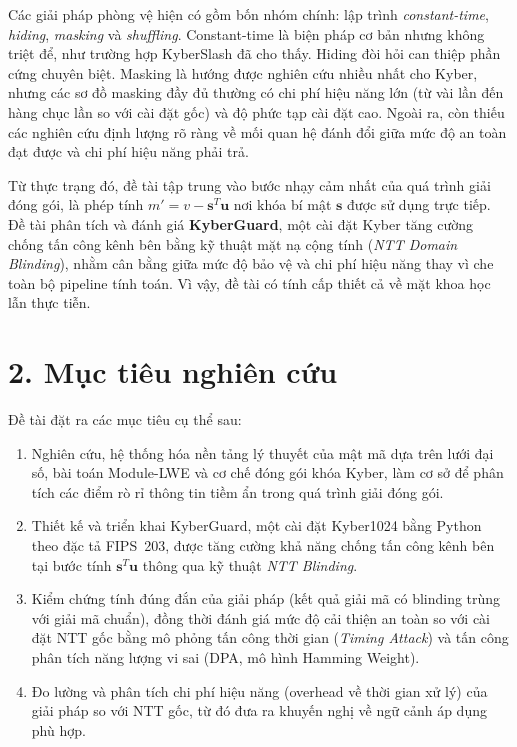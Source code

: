 \documentclass[../LuanVan.tex]{subfiles}
\begin{document}
Các giải pháp phòng vệ hiện có gồm bốn nhóm chính: lập trình \textit{constant-time}, \textit{hiding}, \textit{masking} và \textit{shuffling}. Constant-time là biện pháp cơ bản nhưng không triệt để, như trường hợp KyberSlash đã cho thấy. Hiding đòi hỏi can thiệp phần cứng chuyên biệt. Masking là hướng được nghiên cứu nhiều nhất cho Kyber, nhưng các sơ đồ masking đầy đủ thường có chi phí hiệu năng lớn (từ vài lần đến hàng chục lần so với cài đặt gốc) và độ phức tạp cài đặt cao. Ngoài ra, còn thiếu các nghiên cứu định lượng rõ ràng về mối quan hệ đánh đổi giữa mức độ an toàn đạt được và chi phí hiệu năng phải trả.

Từ thực trạng đó, đề tài tập trung vào bước nhạy cảm nhất của quá trình giải đóng gói, là phép tính $m' = v - \mathbf{s}^{T}\mathbf{u}$ nơi khóa bí mật $\mathbf{s}$ được sử dụng trực tiếp. Đề tài phân tích và đánh giá \textbf{KyberGuard}, một cài đặt Kyber tăng cường chống tấn công kênh bên bằng kỹ thuật mặt nạ cộng tính (\textit{NTT Domain Blinding}), nhằm cân bằng giữa mức độ bảo vệ và chi phí hiệu năng thay vì che toàn bộ pipeline tính toán. Vì vậy, đề tài có tính cấp thiết cả về mặt khoa học lẫn thực tiễn.

\section*{2. Mục tiêu nghiên cứu}

Đề tài đặt ra các mục tiêu cụ thể sau:
\begin{enumerate}
    \item Nghiên cứu, hệ thống hóa nền tảng lý thuyết của mật mã dựa trên lưới đại số, bài toán Module-LWE và cơ chế đóng gói khóa Kyber, làm cơ sở để phân tích các điểm rò rỉ thông tin tiềm ẩn trong quá trình giải đóng gói.
    \item Thiết kế và triển khai KyberGuard, một cài đặt Kyber1024 bằng Python theo đặc tả FIPS~203, được tăng cường khả năng chống tấn công kênh bên tại bước tính $\mathbf{s}^{T}\mathbf{u}$ thông qua kỹ thuật \textit{NTT Blinding}.
    \item Kiểm chứng tính đúng đắn của giải pháp (kết quả giải mã có blinding trùng với giải mã chuẩn), đồng thời đánh giá mức độ cải thiện an toàn so với cài đặt NTT gốc bằng mô phỏng tấn công thời gian (\textit{Timing Attack}) và tấn công phân tích năng lượng vi sai (DPA, mô hình Hamming Weight).
    \item Đo lường và phân tích chi phí hiệu năng (overhead về thời gian xử lý) của giải pháp so với NTT gốc, từ đó đưa ra khuyến nghị về ngữ cảnh áp dụng phù hợp.
\end{enumerate}
\end{document}
